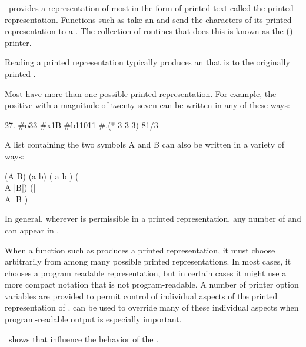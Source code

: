 
\clisp\ provides a representation of most  in the form 
of printed text called the printed representation.
Functions such as  take an  
and send the characters of its printed representation to a . 
The collection of routines that does this is known as the (\clisp) printer.  

Reading a printed representation 
typically
produces an  that is  to the
originally printed .


Most  have more than one possible printed representation.
For example, the positive  with a magnitude of twenty-seven
can be written in any of these ways:

    27.    #o33    #x1B    #b11011    #.(* 3 3 3)    81/3
\endcode

A list containing the two symbols \f{A} and \f{B} can also be written
in a variety of ways:

\code
 (A B)    (a b)    (  a  b )    (\\A |B|) 
(|\\A|
  B
)
\endcode

In general,
wherever  is permissible in a printed representation,
any number of  and  can appear in .

When a function such as  produces a printed representation,
it must choose arbitrarily from among many possible printed representations.
In most cases, it chooses a 
program readable representation, 
but in certain cases it might use a more compact notation that is not 
program-readable.  A number of printer option variables are provided to
permit control of individual aspects of the printed representation of 
.   can be used to override
many of these individual aspects when program-readable output is especially
important.

\Thenextfigure\ shows  that influence the behavior
of the .

